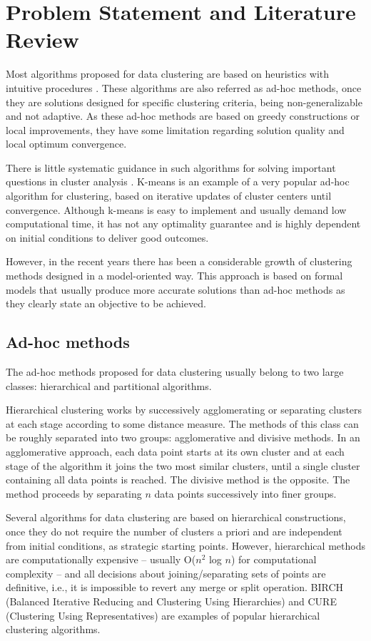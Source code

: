 \chapter{Problem Statement and Literature Review}

Most algorithms proposed for data clustering are based on heuristics with intuitive procedures \cite{Fraley2002}. These algorithms are also referred as ad-hoc methods, once they are solutions designed for specific clustering criteria, being non-generalizable and not adaptive. As these ad-hoc methods are based on greedy constructions or local improvements, they have some limitation regarding solution quality and local optimum convergence.

There is little systematic guidance in such algorithms for solving important questions in cluster analysis \cite{Fraley2002}. K-means is an example of a very popular ad-hoc algorithm for clustering, based on iterative updates of cluster centers until convergence. Although k-means is easy to implement and usually demand low computational time, it has not any optimality guarantee and is highly dependent on initial conditions to deliver good outcomes.

However, in the recent years there has been a considerable growth of clustering methods designed in a model-oriented way. This approach is based on formal models that usually produce more accurate solutions than ad-hoc methods as they clearly state an objective to be achieved.

\section{Ad-hoc methods}
The ad-hoc methods proposed for data clustering usually belong to two large classes: hierarchical and partitional algorithms.

Hierarchical clustering works by successively agglomerating or separating clusters at each stage according to some distance measure. The methods of this class can be roughly separated into two groups: agglomerative and divisive methods. In an agglomerative approach, each data point starts at its own cluster and at each stage of the algorithm it joins the two most similar clusters, until a single cluster containing all data points is reached. The divisive method is the opposite. The method proceeds by separating $n$ data points successively into finer groups. 

Several algorithms for data clustering are based on hierarchical constructions, once they do not require the number of clusters a priori and are independent from initial conditions, as strategic starting points. However, hierarchical methods are computationally expensive -- usually O($n^2$ log $n$) for computational complexity -- and all decisions about joining/separating sets of points are definitive, i.e., it is impossible to revert any merge or split operation. BIRCH (Balanced Iterative Reducing and Clustering Using Hierarchies) \cite{Zhang96} and CURE (Clustering Using Representatives) \cite{Guha1998} are examples of popular hierarchical clustering algorithms.
 
